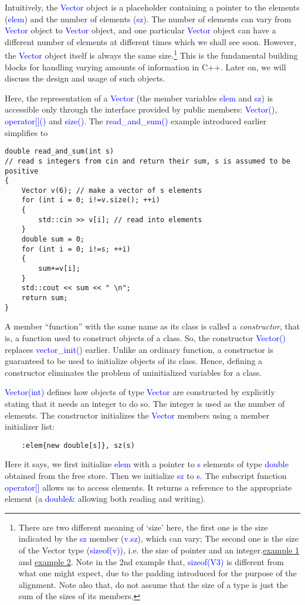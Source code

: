 \documentclass{article}
\newcommand{\be}[1]{\textcolor{blue}{#1}}
\begin{document}
Intuitively, the \be{Vector} object is a placeholder containing a pointer to the elements (\be{elem}) and the number of elements (\be{sz}). The number of elements can vary from \be{Vector} object to \be{Vector} object, and one particular \be{Vector} object can have a different number of elements at different times which we shall see soon. However, the \be{Vector} object itself is always the same size.\footnote{There are two different meaning of `size' here, the first one is the size indicated by the \be{sz} member (\be{v.sz}), which can vary; The second one is the size of the Vector type (\be{sizeof(v)}), i.e. the size of pointer and an integer.\href{https://godbolt.org/z/PM6437}{example 1} and \href{https://godbolt.org/z/GsW74s}{example 2}. Note in the 2nd example that, \be{sizeof(V3)} is different from what one might expect, due to the padding introduced for the purpose of the alignment. Note also that, do not assume that the size of a type is just the sum of the sizes of its members.} This is the fundamental building blocks for handling varying amounts of information in C++. Later on, we will discuss the design and usage of such objects.

Here, the representation of a \be{Vector} (the member variables \be{elem} and \be{sz}) is accessible only through the interface provided by public members: \be{Vector()}, \be{operator[]()} and \be{size()}. The \be{read\_and\_sum()} example introduced earlier simplifies to 
\begin{verbatim}
double read_and_sum(int s)
// read s integers from cin and return their sum, s is assumed to be positive
{
    Vector v(6); // make a vector of s elements
    for (int i = 0; i!=v.size(); ++i)
    {
        std::cin >> v[i]; // read into elements
    }
    double sum = 0;
    for (int i = 0; i!=s; ++i)
    {
        sum+=v[i];
    }
    std::cout << sum << " \n";
    return sum;
}	
\end{verbatim}
A member ``function'' with the same name as its class is called a \emph{constructor}, that is, a function used to construct objects of a class. So, the constructor \be{Vector()} replaces \be{vector\_init()} earlier. Unlike an ordinary function, a constructor is guaranteed to be used to initialize objects of its class. Hence, defining a constructor eliminates the problem of uninitialized variables for a class.

\be{Vector(int)} defines how objects of type \be{Vector} are constructed by explicitly stating that it needs an integer to do so. The integer is used as the number of elements. The constructor initializes the \be{Vector} members using a member initializer list:
\begin{verbatim}
	:elem{new double[s]}, sz(s)
\end{verbatim}
Here it says, we first initialize \be{elem} with a pointer to \be{s} elements of type \be{double} obtained from the free store. Then we initialize \be{sz} to \be{s}. The subscript function \be{operator[]} allows us to access elements. It returns a reference to the appropriate element (a \be{double\&} allowing both reading and writing).
\end{document}
